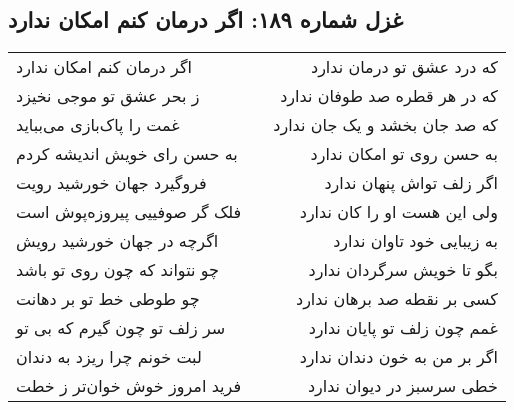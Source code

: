 \begin{center}
\section*{غزل شماره ۱۸۹: اگر درمان کنم امکان ندارد}
\label{sec:189}
\begin{longtable}{l p{0.5cm} r}
اگر درمان کنم امکان ندارد
&&
که درد عشق تو درمان ندارد
\\
ز بحر عشق تو موجی نخیزد
&&
که در هر قطره صد طوفان ندارد
\\
غمت را پاک‌بازی می‌بباید
&&
که صد جان بخشد و یک جان ندارد
\\
به حسن رای خویش اندیشه کردم
&&
به حسن روی تو امکان ندارد
\\
فروگیرد جهان خورشید رویت
&&
اگر زلف تواش پنهان ندارد
\\
فلک گر صوفییی پیروزه‌پوش است
&&
ولی این هست او را کان ندارد
\\
اگرچه در جهان خورشید رویش
&&
به زیبایی خود تاوان ندارد
\\
چو نتواند که چون روی تو باشد
&&
بگو تا خویش سرگردان ندارد
\\
چو طوطی خط تو بر دهانت
&&
کسی بر نقطه صد برهان ندارد
\\
سر زلف تو چون گیرم که بی تو
&&
غمم چون زلف تو پایان ندارد
\\
لبت خونم چرا ریزد به دندان
&&
اگر بر من به خون دندان ندارد
\\
فرید امروز خوش خوان‌تر ز خطت
&&
خطی سرسبز در دیوان ندارد
\\
\end{longtable}
\end{center}
